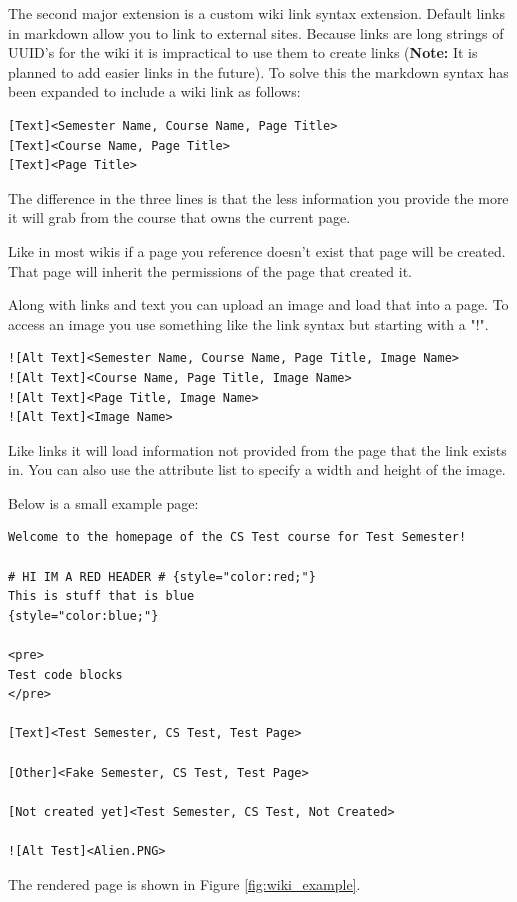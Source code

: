 \documentclass[11pt]{report}
\begin{document}
The second major extension is a custom wiki link syntax extension. Default links in markdown allow
you to link to external sites. Because links are long strings of UUID's for the wiki it is impractical
to use them to create links (\textbf{Note:} It is planned to add easier links in the future). To solve 
this the markdown syntax has been expanded to include a wiki link as follows:

\begin{verbatim}
[Text]<Semester Name, Course Name, Page Title>
[Text]<Course Name, Page Title>
[Text]<Page Title>
\end{verbatim} 

The difference in the three lines is that the less information you provide the more it will grab from
the course that owns the current page.

Like in most wikis if a page you reference doesn't exist that page will be created. That page will inherit
the permissions of the page that created it. 

Along with links and text you can upload an image and load that into a page. To access an image you use
something like the link syntax but starting with a "!".

\begin{verbatim}
![Alt Text]<Semester Name, Course Name, Page Title, Image Name>
![Alt Text]<Course Name, Page Title, Image Name>
![Alt Text]<Page Title, Image Name>
![Alt Text]<Image Name>
\end{verbatim}

Like links it will load information not provided from the page that the link exists in. You can also use
the attribute list to specify a width and height of the image.

\pagebreak
Below is a small example page:
\begin{verbatim}
Welcome to the homepage of the CS Test course for Test Semester!

# HI IM A RED HEADER # {style="color:red;"}
This is stuff that is blue
{style="color:blue;"}

<pre>
Test code blocks
</pre>

[Text]<Test Semester, CS Test, Test Page> 

[Other]<Fake Semester, CS Test, Test Page>

[Not created yet]<Test Semester, CS Test, Not Created>

![Alt Test]<Alien.PNG>
\end{verbatim}

The rendered page is shown in Figure \ref{fig:wiki_example}.
\end{document}

